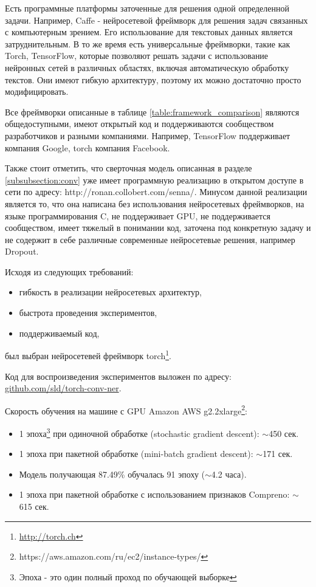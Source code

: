 Есть программные платформы заточенные для решения одной определенной задачи.
Например, Caffe - нейросетевой фреймворк для решения задач связанных с компьютерным зрением.
Его использование для текстовых данных является затруднительным.
В то же время есть универсальные фреймворки, такие как Torch, TensorFlow,
которые позволяют решать задачи с использование нейронных сетей в различных
областях, включая автоматическую обработку текстов.
Они имеют гибкую архитектуру, поэтому их можно достаточно просто модифицировать.

Все фреймворки описанные в таблице \ref{table:framework_comparison} являются
общедоступными, имеют открытый код и поддерживаются сообществом разработчиков и
разными компаниями. Например, TensorFlow поддерживает компания Google, torch
компания Facebook.

Также стоит отметить, что сверточная модель описанная в разделе \ref{subsubsection:conv}
уже имеет программную реализацию в открытом доступе в сети по адресу: http://ronan.collobert.com/senna/.
Минусом данной реализации является то, что она написана без использования
нейросетевых фреймворков, на языке программирования C, не поддерживает GPU,
не поддерживается сообществом, имеет тяжелый в понимании код, заточена под конкретную задачу
и не содержит в себе различные современные нейросетевые решения, например Dropout.

Исходя из следующих требований:
\begin{itemize}
\item гибкость в реализации нейросетевых архитектур,
\item быстрота проведения экспериментов,
\item поддерживаемый код,
\end{itemize}
был выбран нейросетевей фреймворк torch\footnote{\url{http://torch.ch}}.

Код для воспроизведения экспериментов выложен по адресу:
\href{https://github.com/sld/torch-conv-ner}{github.com/sld/torch-conv-ner}.

Скорость обучения на машине с GPU Amazon AWS g2.2xlarge\footnote{https://aws.amazon.com/ru/ec2/instance-types/}:
\begin{itemize}
\item 1 эпоха\footnote{Эпоха - это один полный проход по обучающей выборке} при одиночной обработке (stochastic gradient descent): $\sim$450 сек.
\item 1 эпоха при пакетной обработке (mini-batch gradient descent): $\sim$171 сек.
\item Модель получающая 87.49\% обучалась 91 эпоху ($\sim$4.2 часа).
\item 1 эпоха при пакетной обработке с использованием признаков Compreno: $\sim$615 сек.
\end{itemize}

